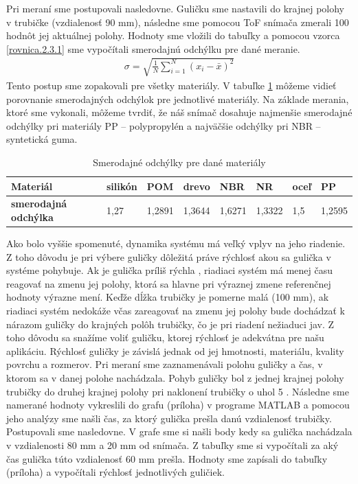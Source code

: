 Pri meraní sme postupovali nasledovne. Guličku sme nastavili do krajnej polohy v trubičke (vzdialenosť 90 mm), následne sme pomocou ToF snímača zmerali 100 hodnôt jej aktuálnej polohy. Hodnoty sme vložili do tabuľky a pomocou vzorca \ref{rovnica.2.3.1} sme vypočítali smerodajnú odchýlku pre dané meranie.
\begin{align}
	\label{rovnica.2.3.1}
	\sigma = \sqrt{\frac{1}{N}\sum_{i=1}^{N}(x_i-\bar{x})^{2}}
\end{align} Tento postup sme zopakovali pre všetky materiály. V tabuľke \ref{TABULKA_2_1} môžeme vidieť porovnanie smerodajných odchýlok pre jednotlivé materiály. Na základe merania, ktoré sme vykonali, môžeme tvrdiť, že náš snímač dosahuje najmenšie smerodajné odchýlky pri materiály PP – polypropylén a najväčšie odchýlky pri NBR – syntetická guma. 


\begin{table}[ht]
	\centering
    \begin{tabular}{|l|l|l|l|l|l|l|l|}
    	\hline
    	\textbf{Materiál}            & silikón & POM    & drevo  & NBR                            & NR     & oceľ & PP                             \\ \hline
    	\textbf{smerodajná odchýlka} & 1,27    & 1,2891 & 1,3644 & \cellcolor[HTML]{FFCCC9}1,6271 & 1,3322 & 1,5  & \cellcolor[HTML]{9AFF99}1,2595 \\ \hline
    \end{tabular}
	
    \caption{Smerodajné odchýlky pre dané materiály}
    \label{TABULKA_2_1}
\end{table}
Ako bolo vyššie spomenuté, dynamika systému má veľký vplyv na jeho riadenie. Z toho dôvodu je pri výbere guličky dôležitá práve rýchlosť akou sa gulička v systéme pohybuje. Ak je gulička príliš rýchla  , riadiaci systém má menej času reagovať na zmenu jej polohy, ktorá sa hlavne pri výraznej zmene referenčnej hodnoty výrazne mení. Keďže dĺžka trubičky je pomerne malá (100 mm), ak riadiaci systém nedokáže včas zareagovať  na zmenu jej polohy bude dochádzať k nárazom guličky do krajných polôh trubičky, čo je pri riadení nežiaduci jav. Z toho dôvodu sa snažíme voliť guličku, ktorej rýchlosť je adekvátna pre našu aplikáciu. Rýchlosť guličky je závislá jednak od jej hmotnosti, materiálu, kvality povrchu a rozmerov.
Pri meraní sme zaznamenávali polohu guličky a čas, v ktorom sa v danej polohe nachádzala. Pohyb guličky bol z jednej krajnej polohy trubičky do druhej krajnej polohy pri naklonení trubičky o uhol 5 \degree. Následne sme namerané hodnoty vykreslili do grafu (príloha) v programe MATLAB a pomocou jeho analýzy sme našli čas, za ktorý gulička prešla danú vzdialenosť trubičky. Postupovali sme nasledovne. V grafe sme si našli body kedy sa gulička nachádzala v vzdialenosti 80 mm a 20 mm od snímača. Z tabuľky sme si vypočítali za aký čas gulička túto vzdialenosť 60 mm prešla. Hodnoty sme zapísali do tabuľky (príloha) a vypočítali rýchlosť jednotlivých guličiek. 

